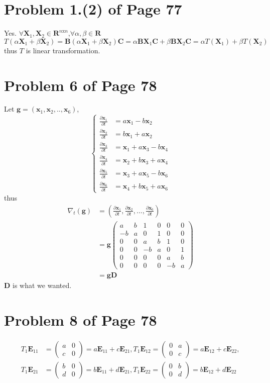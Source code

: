\documentclass[12pt,a4paper]{article}
\newcommand{\mysection}[2]{
\section{Problem #1 of Page #2}	
	}
\begin{document}
\mysection{1.(2)}{77}
Yes. $\forall \bm{X}_1 ,\bm{X}_2 \in \mathbf{R}^{n\text{x}n}$,$\forall 
\alpha,\beta \in \mathbf{R}
$\\
\[T(\alpha \bm{X}_1 + \beta \bm{X}_2)
 = \bm{B}(\alpha \bm{X}_1 + \beta \bm{X}_2)\bm{C} 
 = \alpha \bm{B}\bm{X}_1\bm{C} + \beta \bm{BX}_2\bm{C} = \alpha T(\bm{X}_1) + \beta T(\bm{X}_2) \]
thus $T$ is linear transformation.
\mysection{6}{78}
Let $\bm{g} = (\bm{x}_1,\bm{x}_2,..,\bm{x}_6)$,
\begin{equation*}
\left\lbrace 
\begin{aligned}
\frac{\partial \bm{x}_1}{\partial t} &= a\bm{x}_1-b\bm{x}_2 \\
\frac{\partial \bm{x}_2}{\partial t} &= b\bm{x}_1+a\bm{x}_2\\
\frac{\partial \bm{x}_3}{\partial t} &=\bm{x}_1 + a\bm{x}_3 - b\bm{x}_4 \\
\frac{\partial \bm{x}_4}{\partial t}&=\bm{x}_2 + b\bm{x}_3 + a\bm{x}_4\\
\frac{\partial \bm{x}_5}{\partial t}&=\bm{x}_3 + a\bm{x}_5 - b\bm{x}_6\\
\frac{\partial \bm{x}_6}{\partial t}&= \bm{x}_4 +b\bm{x}_5 + a\bm{x}_6 
\end{aligned}
\right .
\end{equation*}
thus 
\begin{equation*}
\begin{split}
\nabla_t(\bm{g}) &= (\frac{\partial \bm{x}_1}{\partial t},
\frac{\partial \bm{x}_2}{\partial t},...,\frac{\partial \bm{x}_6}{\partial t}) \\
&=\bm{g} \left(
\begin{array}{cccccc}
a & b & 1 &0 &0 &0 \\
-b &a & 0 &1&0 &0 \\
0 &0 &a &b &1 &0\\
0 &0 &-b&a&0 &1\\
0 &0 &0 &0&a&b\\
0 &0 &0 &0 &-b &a
\end{array}
\right)\\
&= \bm{gD}
\end{split}
\end{equation*}
$\bm D$ is what we wanted.
\mysection{8}{78}
\[
\begin{split}
T_1\bm{E}_{11} &=\left(  \begin{array}{cc}
a & 0 \\
c & 0
\end{array}
\right)=a\bm{E}_{11} + c\bm{E}_{21},
T_1\bm{E}_{12} =\left(  \begin{array}{cc}
0 & a \\
0 & c
\end{array}
\right)
= a\bm{E}_{12} + c\bm{E}_{22},  \\
T_1\bm{E}_{21} &=\left(  \begin{array}{cc}
b & 0 \\
d & 0
\end{array}
\right)
=b\bm{E}_{11} + d\bm{E}_{21}, 
T_1\bm{E}_{22} =\left(  \begin{array}{cc}
0 & b \\
0 & d
\end{array}
\right)
=b\bm{E}_{12} + d\bm{E}_{22}
\end{split}
\]
\end{document}
